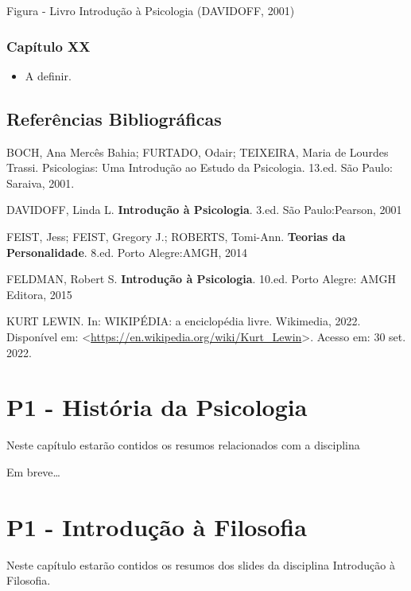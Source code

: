 \documentclass[
]{book}
\providecommand{\tightlist}{%
  \setlength{\itemsep}{0pt}\setlength{\parskip}{0pt}}
\begin{document}
Figura - Livro Introdução à Psicologia (DAVIDOFF, 2001)

\hypertarget{capuxedtulo-xx}{%
\subsection{Capítulo XX}\label{capuxedtulo-xx}}

\begin{itemize}
\tightlist
\item
  A definir.
\end{itemize}

\hypertarget{referuxeancias-bibliogruxe1ficas-1}{%
\section{Referências Bibliográficas}\label{referuxeancias-bibliogruxe1ficas-1}}

BOCH, Ana Mercês Bahia; FURTADO, Odair; TEIXEIRA, Maria de Lourdes Trassi. Psicologias: Uma Introdução ao Estudo da Psicologia. 13.ed. São Paulo: Saraiva, 2001.

DAVIDOFF, Linda L. \textbf{Introdução à Psicologia}. 3.ed. São Paulo:Pearson, 2001

FEIST, Jess; FEIST, Gregory J.; ROBERTS, Tomi-Ann. \textbf{Teorias da Personalidade}. 8.ed. Porto Alegre:AMGH, 2014

FELDMAN, Robert S. \textbf{Introdução à Psicologia}. 10.ed. Porto Alegre: AMGH Editora, 2015

KURT LEWIN. In: WIKIPÉDIA: a enciclopédia livre. Wikimedia, 2022. Disponível em: \textless{}\url{https://en.wikipedia.org/wiki/Kurt_Lewin}\textgreater. Acesso em: 30 set. 2022.

\hypertarget{p1---histuxf3ria-da-psicologia}{%
\chapter{P1 - História da Psicologia}\label{p1---histuxf3ria-da-psicologia}}

Neste capítulo estarão contidos os resumos relacionados com a disciplina

Em breve\ldots{}

\hypertarget{p1---introduuxe7uxe3o-uxe0-filosofia}{%
\chapter{P1 - Introdução à Filosofia}\label{p1---introduuxe7uxe3o-uxe0-filosofia}}

Neste capítulo estarão contidos os resumos dos slides da disciplina Introdução à Filosofia.
\end{document}
